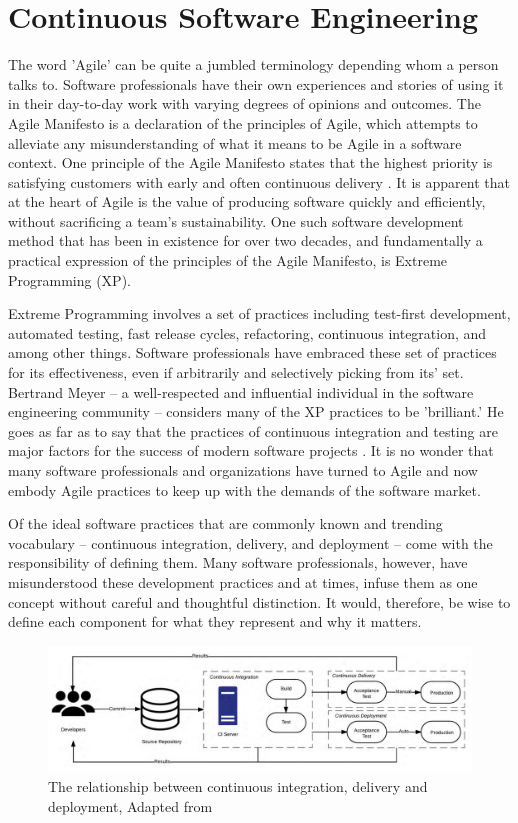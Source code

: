 \documentclass[12pt,a4paper]{article}
\begin{document}
\section{Continuous Software Engineering}
The word 'Agile' can be quite a jumbled terminology depending whom a person talks to. Software professionals have their own experiences and stories of using it in their day-to-day work with varying degrees of opinions and outcomes. The Agile Manifesto is a declaration of the principles of Agile, which attempts to alleviate any misunderstanding of what it means to be Agile in a software context. One principle of the Agile Manifesto states that the highest priority is satisfying customers with early and often continuous delivery \cite[p. ~50]{meyer_2014}. It is apparent that at the heart of Agile is the value of producing software quickly and efficiently, without sacrificing a team's sustainability. One such software development method that has been in existence for over two decades, and fundamentally a practical expression of the principles of the Agile Manifesto, is Extreme Programming (XP).

Extreme Programming involves a set of practices including test-first development, automated testing, fast release cycles, refactoring, continuous integration, and among other things. Software professionals have embraced these set of practices for its effectiveness, even if arbitrarily and selectively picking from its' set. Bertrand Meyer -- a well-respected and influential individual in the software engineering community -- considers many of the XP practices to be 'brilliant.' He goes as far as to say that the practices of continuous integration and testing are major factors for the success of modern software projects \cite[p. ~154]{meyer_2014}. It is no wonder that many software professionals and organizations have turned to Agile and now embody Agile practices to keep up with the demands of the software market.

Of the ideal software practices that are commonly known and trending vocabulary -- continuous integration, delivery, and deployment -- come with the responsibility of defining them. Many software professionals, however, have misunderstood these development practices and at times, infuse them as one concept without careful and thoughtful distinction. It would, therefore, be wise to define each component for what they represent and why it matters.

\begin{figure}[ht!]
    \includegraphics[width=1.02\textwidth]{images/ci_cde_cd.png}
    \captionsetup{justification=centering, labelfont=bf}
    \caption{The relationship between continuous integration, delivery and deployment, Adapted from \protect{}}
    \label{ci_cde_cd}
\end{figure}
\end{document}
